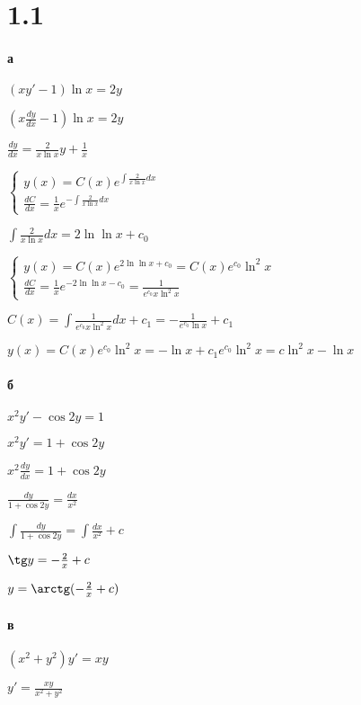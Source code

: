 \documentclass[russian]{article}
\begin{document}
\section*{1.1}

\paragraph*{а}
$(xy' - 1) \ln x = 2y$

$(x \frac{dy}{dx} - 1) \ln x = 2y$

$\frac{dy}{dx} = \frac{2}{x \ln x} y + \frac{1}{x}$

$\begin{cases}
y(x) = C(x) e^{\int \frac{2}{x \ln x} dx} \\
\frac{dC}{dx} = \frac{1}{x} e^{-\int \frac{2}{x \ln x} dx}
\end{cases}$

$\int \frac{2}{x \ln x} dx = 2 \ln \ln x + c_0$

$\begin{cases}
y(x) = C(x) e^{2 \ln \ln x + c_0} = C(x) e^{c_0} \ln ^2 x\\
\frac{dC}{dx} = \frac{1}{x} e^{-2 \ln \ln x - c_0} = \frac{1}{e^{c_0} x \ln ^2 x}
\end{cases}$

$C(x) = \int \frac{1}{e^{c_0} x \ln ^2 x} dx + c_1 = - \frac{1}{e^{c_0} \ln x} + c_1$

$y(x) = C(x) e^{c_0} \ln ^2 x = -\ln x + c_1 e^{c_0} \ln ^2 x = c \ln ^2 x - \ln x$

\paragraph*{б}

$x^2 y' - \cos 2y = 1$

$x^2 y' = 1 + \cos 2y$

$x^2 \frac{dy}{dx} = 1 + \cos 2y$

$\frac{dy}{1 + \cos 2y} = \frac{dx} {x^2}$

$\int \frac{dy}{1 + \cos 2y} = \int \frac{dx} {x^2} + c$

$\tg y = - \frac{2}{x} + c$

$y = \arctg(- \frac{2}{x} + c)$

\paragraph*{в}

$(x^2 + y^2) y' = xy$

$y' = \frac{xy}{x^2 + y^2}$
\end{document}
